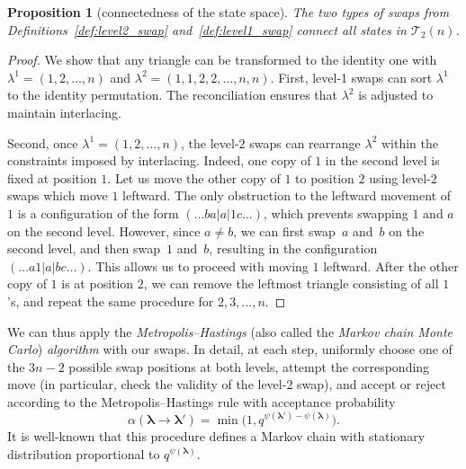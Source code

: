 \documentclass[pdftex]{sigma}
\numberwithin{equation}{section}
\newtheorem{Proposition}[Theorem]{Proposition}
\theoremstyle{definition}
\begin{document}
\begin{Proposition}[connectedness of the state space]
	\label{prop:connected_state_space} The two types of swaps from
	Definitions~{\rm \ref{def:level2_swap}} and~{\rm \ref{def:level1_swap}} connect all states in
	$\mathcal{T}_2(n)$.
\end{Proposition}
\begin{proof}
	We show that any triangle can be transformed to the identity one with
	$\lambda^1 = (1, 2, \dots, n)$ and
	$\lambda^2 = (1, 1, 2, 2, \dots, n, n)$.
	First, level-1 swaps can sort $\lambda^1$ to the identity permutation.
	The reconciliation ensures that $\lambda^2$ is adjusted to maintain
	interlacing.

	Second, once $\lambda^1 = (1, 2, \dots, n)$, the level-$2$ swaps can
	rearrange $\lambda^2$ within the constraints imposed by interlacing.
	Indeed, one copy of $1$ in the second level is fixed at position $1$.
	Let us move the other copy of $1$ to position $2$ using level-$2$ swaps
	which move $1$ leftward.
	The only obstruction to the leftward movement of $1$ is a configuration of
	the form $(\dots b a|a|1c\dots)$, which prevents swapping $1$ and $a$ on
	the second level.
	However, since $a\ne b$, we can first swap~$a$ and~$b$ on the second level,
	and then swap~$1$ and~$b$, resulting in the configuration
	$(\dots a1|a|bc\dots)$.
	This allows us to proceed with moving $1$ leftward.
	After the other copy of $1$ is at position $2$, we can remove the leftmost
	triangle consisting of all $1$'s, and repeat the same procedure for
	$2,3,\dots,n$.
\end{proof}

We can thus apply the \emph{Metropolis--Hastings} (also called the \emph{Markov
chain Monte Carlo}) \emph{algorithm} with our swaps.
In detail, at each step, uniformly choose one of the $3n-2$ possible swap
positions at both levels, attempt the corresponding move (in particular, check
the validity of the level-2 swap), and accept or reject according to the
Metropolis--Hastings rule with acceptance probability
\begin{equation*}
	\alpha(\boldsymbol\lambda \to \boldsymbol\lambda') = \min\bigl(1,
	q^{\psi(\boldsymbol\lambda') - \psi(\boldsymbol\lambda)}\bigr).
\end{equation*}
It is well-known
\cite{LevinPeres2017}
that this procedure defines a Markov chain with stationary distribution
proportional to $q^{\psi(\boldsymbol\lambda)}$.
\end{document}
